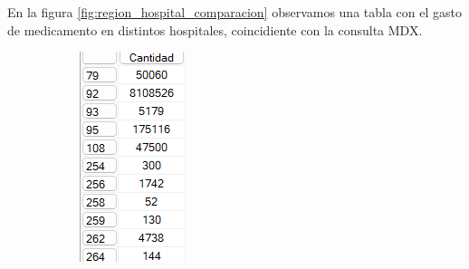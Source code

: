 \documentclass{article}
\begin{document}
En la figura \ref{fig:region_hospital_comparacion} observamos una tabla con el gasto de medicamento en distintos hospitales, coincidiente con la consulta MDX.
\begin{figure}[H]
	\centering
	\begin{subfigure}[b]{0.2\textwidth}
		\centering
		\includegraphics[width=\textwidth]{images/cantidad_region_hospital_tabla_mdx.png}

\end{subfigure}
\end{figure}
\end{document}
